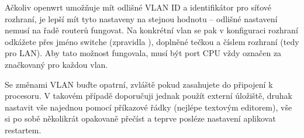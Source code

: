 Ačkoliv \gls{openwrt} umožňuje mít odlišné VLAN ID a identifikátor pro síťové
rozhraní, je lepší mít tyto nastaveny na stejnou hodnotu -- odlišné nastavení
nemusí na řadě routerů fungovat. Na konkrétní \gls{vlan} se pak v konfiguraci
rozhraní odkážete přes jméno switche (zpravidla ), doplněné tečkou
a číslem rozhraní (tedy  pro LAN). Aby tato možnost fungovala, musí
být port CPU vždy označen za značkovaný pro každou \gls{vlan}.

Se změnami VLAN buďte opatrní, zvláště pokud zasahujete do připojení k procesoru.
V takovém případě doporučuji jednak použít externí úložiště, druhak nastavit
vše najednou pomocí příkazové řádky (nejlépe textovým editorem), vše si po sobě
několikrát opakovaně přečíst a teprve posléze nastavení aplikovat restartem.
